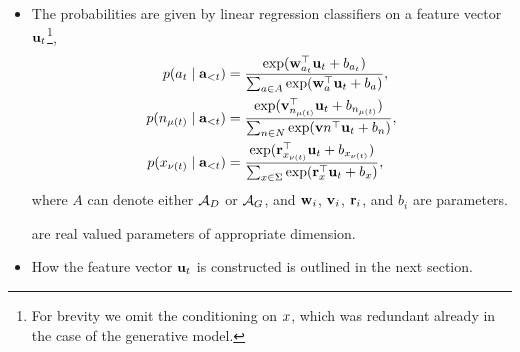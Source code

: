 \begin{itemize}
  \item The probabilities are given by linear regression classifiers on a feature vector $\mathbf{u}_t$\footnote{For brevity we omit the conditioning on $x$, which was redundant already in the case of the generative model.},
  \begin{align}
    \label{eq:action-regression}
    p(a_t \mid \mathbf{a}_{<t})
      &= \frac{ \exp ( \mathbf{w}_{a_t}^{\top} \mathbf{u}_t + b_{a_t} ) }{ \sum_{a \in A} \exp ( \mathbf{w}_{a}^{\top} \mathbf{u}_t + b_{a} ) },  \\
    p(n_{\mu(t)} \mid \mathbf{a}_{<t})
      &= \frac{ \exp ( \mathbf{v}_{n_{\mu(t)}}^{\top} \mathbf{u}_t + b_{n_{\mu(t)}} ) }{ \sum_{n \in N} \exp ( \mathbf{v} {n}^{\top} \mathbf{u}_t + b_{n} ) }, \\
    p(x_{\nu(t)} \mid \mathbf{a}_{<t})
      &= \frac{ \exp ( \mathbf{r}_{x_{\nu(t)}}^{\top} \mathbf{u}_t + b_{x_{\nu(t)}} ) }{ \sum_{x \in \Sigma} \exp ( \mathbf{r}_{x}^{\top} \mathbf{u}_t + b_{x} ) },  \\
  \end{align}
  where $A$ can denote either $\mathcal{A}_D$ or $\mathcal{A}_G$, and $\mathbf{w}_i$, $\mathbf{v}_i$, $\mathbf{r}_i$, and $b_i$ are parameters.


  are real valued parameters of appropriate dimension.

  \item How the feature vector $\mathbf{u}_t$ is constructed is outlined in the next section.


\end{itemize}

